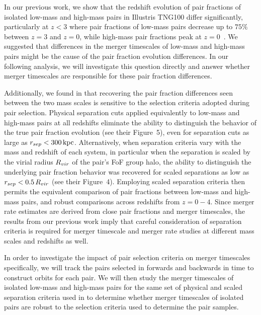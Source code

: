 \documentclass[twocolumn,linenumbers]{aastex631}
\newcommand{\chambe}{\citet{Chamberlain2024}}
\begin{document}
In our previous work, we show that the redshift evolution of pair fractions of isolated low-mass and high-mass pairs in Illustris TNG100 differ significantly, particularly at $z<3$ where pair fractions of low-mass pairs decrease up to $75\%$ between $z=3$ and $z=0$, while high-mass pair fractions peak at $z=0$~\citep{Chamberlain2024}. 
We suggested that differences in the merger timescales of low-mass and high-mass pairs might be the cause of the pair fraction evolution differences.
In our following analysis, we will investigate this question directly and answer whether merger timescales are responsible for these pair fraction differences.

Additionally, we found in \citet{Chamberlain2024} that recovering the pair fraction differences seen between the two mass scales is sensitive to the selection criteria adopted during pair selection.
Physical separation cuts applied equivalently to low-mass and high-mass pairs at all redshifts eliminate the ability to distinguish the behavior of the true pair fraction evolution (see their Figure~5), even for separation cuts as large as $r_{sep}<300\mathrm{\,kpc}$. 
Alternatively, when separation criteria vary with the mass and redshift of each system, in particular when the separation is scaled by the virial radius $R_{vir}$ of the pair's FoF group halo, the ability to distinguish the underlying pair fraction behavior was recovered for scaled separations as low as $r_{sep} < 0.5\,R_{vir}$ (see their Figure~4). 
Employing scaled separation criteria then permits the equivalent comparison of pair fractions between low-mass and high-mass pairs, and robust comparisons across redshifts from $z=0-4$. 
Since merger rate estimates are derived from close pair fractions and merger timescales, the results from our previous work imply that careful consideration of separation criteria is required for merger timescale and merger rate studies at different mass scales and redshifts as well.

In order to investigate the impact of pair selection criteria on merger timescales specifically, we will track the pairs selected in \chambe{} forwards and backwards in time to construct orbits for each pair.
We will then study the merger timescales of isolated low-mass and high-mass pairs for the same set of physical and scaled separation criteria used in \chambe{} to determine whether merger timescales of isolated pairs are robust to the selection criteria used to determine the pair samples. 
\end{document}
